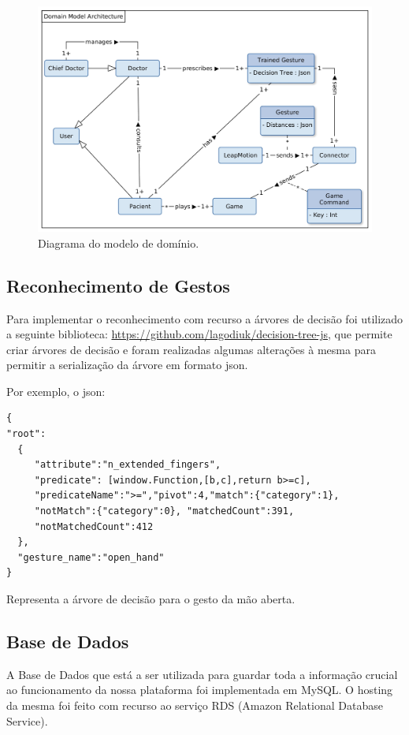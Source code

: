 \documentclass{TTUPhD}
\begin{document}
\begin{figure}[h!]
    \center
    \includegraphics[scale=0.15]{./img/model.jpg}
    \caption{Diagrama do modelo de domínio.}
    \label{fig:model_diagram}
\end{figure}

\newpage

\subsection{Reconhecimento de Gestos}

Para implementar o reconhecimento com recurso a árvores de decisão foi utilizado a seguinte biblioteca: \url{https://github.com/lagodiuk/decision-tree-js},
que permite criar árvores de decisão e foram realizadas algumas alterações à mesma para permitir a serialização da árvore em formato json.

Por exemplo, o json:
\begin{verbatim}
{
"root":
  {
     "attribute":"n_extended_fingers",
     "predicate": [window.Function,[b,c],return b>=c],
     "predicateName":">=","pivot":4,"match":{"category":1},
     "notMatch":{"category":0}, "matchedCount":391,
     "notMatchedCount":412
  },
  "gesture_name":"open_hand"
}
\end{verbatim}

Representa a árvore de decisão para o gesto da mão aberta.

\subsection{Base de Dados}

A Base de Dados que está a ser utilizada para guardar toda a informação crucial ao funcionamento da nossa plataforma foi implementada em MySQL. O hosting da mesma foi feito com recurso ao serviço RDS (Amazon Relational Database Service).
\end{document}
